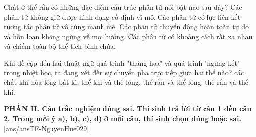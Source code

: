 \begin{ex}%
	Chất ở thể rắn có những đặc điểm cấu trúc phân tử nổi bật nào sau đây?
	\choice
	{Các phân tử không giữ được hình dạng cố định vĩ mô.}
	{\True Các phân tử có lực liên kết tương tác phân tử vô cùng mạnh mẽ.}
	{Các phân tử chuyển động hoàn toàn tự do và hỗn loạn không ngừng về mọi hướng.}
	{Các phân tử có khoảng cách rất xa nhau và chiếm toàn bộ thể tích bình chứa.}
\end{ex}

\begin{ex}%
	Khi đề cập đến hai thuật ngữ quá trình "thăng hoa" và quá trình "ngưng kết" trong nhiệt học, ta đang xét đến sự chuyển pha trực tiếp giữa hai thể nào?
	\choice
	{các chất khí hóa lỏng bất kì.}
	{thể khí và thể lỏng.}
	{thể rắn và thể lỏng.}
	{\True thể rắn và thể khí.}
\end{ex}


\noindent \textbf{PHẦN II. Câu trắc nghiệm đúng sai. Thí sinh trả lời từ câu 1 đến câu 2. Trong mỗi ý a), b), c), d) ở mỗi câu, thí sinh chọn đúng hoặc sai.}
[ans/ansTF-NguyenHue029]

